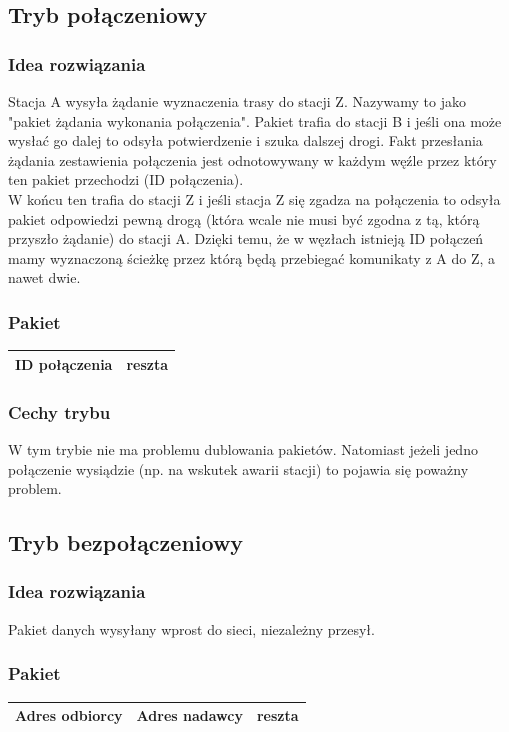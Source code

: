 		\subsection{Tryb połączeniowy}
			\subsubsection{Idea rozwiązania}
				Stacja A wysyła żądanie wyznaczenia trasy do stacji Z. Nazywamy to jako "pakiet żądania wykonania połączenia". Pakiet trafia do stacji B i jeśli ona może wysłać go dalej to odsyła potwierdzenie i szuka dalszej drogi. Fakt przesłania żądania zestawienia połączenia jest odnotowywany w każdym węźle przez który ten pakiet przechodzi (ID połączenia).\\
				W końcu ten trafia do stacji Z i jeśli stacja Z się zgadza na połączenia to odsyła pakiet odpowiedzi pewną drogą (która wcale nie musi być zgodna z tą, którą przyszło żądanie) do stacji A. Dzięki temu, że w węzłach istnieją ID połączeń mamy wyznaczoną ścieżkę przez którą będą przebiegać komunikaty z A do Z, a nawet dwie.
			\subsubsection{Pakiet}
				\begin{tabular}{|c|c|}
					\hline ID połączenia & reszta \\
					\hline 
				\end{tabular}
			\subsubsection{Cechy trybu}
				W tym trybie nie ma problemu dublowania pakietów. Natomiast jeżeli jedno połączenie wysiądzie (np. na wskutek awarii stacji) to pojawia się poważny problem.
		\subsection{Tryb bezpołączeniowy}
			\subsubsection{Idea rozwiązania}
				Pakiet danych wysyłany wprost do sieci, niezależny przesył.
			\subsubsection{Pakiet}
				\begin{tabular}{|c|c|c|}
					\hline Adres odbiorcy & Adres nadawcy & reszta \\ 
					\hline 
				\end{tabular}
